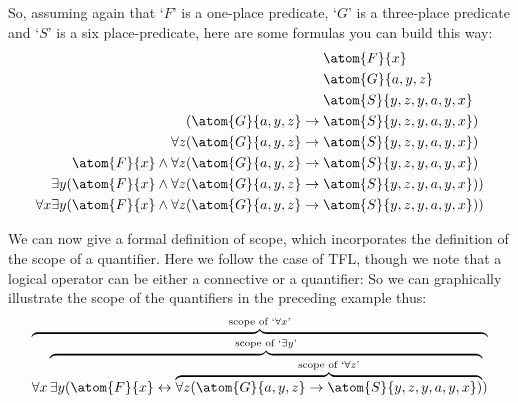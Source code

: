 So, assuming again that `$F$' is a one-place predicate, `$G$' is a three-place predicate and `$S$' is a six place-predicate, here are some formulas you can build this way:
	\begin{align*}
		& \atom{F}{x}\\
		& \atom{G}{a,y,z}\\
		& \atom{S}{y,z,y,a,y,x}\\
		(\atom{G}{a,y,z} \eif {}& \atom{S}{y,z,y,a,y,x})\\
		\forall z (\atom{G}{a,y,z} \eif {}& \atom{S}{y,z,y,a,y,x})\\
		\atom{F}{x} \eand \forall z (\atom{G}{a,y,z} \eif {}& \atom{S}{y,z,y,a,y,x})\\
		\exists y (\atom{F}{x} \eand \forall z (\atom{G}{a,y,z} \eif {}& \atom{S}{y,z,y,a,y,x}))\\
		\forall x \exists y (\atom{F}{x} \eand \forall z (\atom{G}{a,y,z} \eif {}& \atom{S}{y,z,y,a,y,x}))
	\end{align*}

We can now give a formal definition of scope, which incorporates the definition of the scope of a quantifier. Here we follow the case of TFL, though we note that a logical operator can be either a connective or a quantifier:
So we can graphically illustrate the scope of the quantifiers in the preceding example thus:
	$$\overbrace{\forall x \overbrace{\exists y (\atom{F}{x} \eiff \overbrace{\forall z (\atom{G}{a,y,z} \eif \atom{S}{y,z,y,a,y,x})}^{\text{scope of `}\forall z\text{'}}}^{\text{scope of `}\exists y\text{'}})}^{\text{scope of `$\forall x$'}}$$

